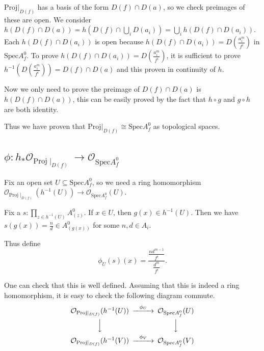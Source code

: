 \documentclass[11pt]{article}
\begin{document}
\(\mathrm{Proj}|_{D(f)}\) has a basis of the form \(D(f)\cap D(a)\), so
we check preimages of these are open. We consider
\(h(D(f)\cap D(a))=h\left(D(f)\cap\bigcup_iD(a_i)\right)=\bigcup_i h(D(f)\cap D(a_i))\).
Each \(h(D(f)\cap D(a_i))\) is open because
\(h(D(f)\cap D(a_i))=D\left(\frac{a_i^m}{f^i}\right)\) in
\(\mathrm{Spec} A^0_f\). To prove
\(h(D(f)\cap D(a_i))=D\left(\frac{a_i^m}{f^i}\right)\), it is sufficient
to prove \(h^{-1}(D\left(\frac{a_i^m}{f^i}\right))=D(f)\cap D(a)\) and
this proven in continuity of \(h\).

Now we only need to prove the preimage of \(D(f)\cap D(a)\) is
\(h(D(f)\cap D(a))\), this can be easily proved by the fact that
\(h\circ g\) and \(g\circ h\) are both identity.

Thus we have proven that
\(\mathrm{Proj}|_{D(f)}\cong \mathrm{Spec} A^0_f\) as topological
spaces.

    \hypertarget{phih_mathcal-o_mathrmprojmid_dfto-mathcal-o_mathrmspeca0_f}{%
\subsection{\texorpdfstring{\(\phi:h_*\mathcal O_{\mathrm{Proj}\mid_{D(f)}}\to \mathcal O_{\mathrm{Spec}A^0_f}\)}{\textbackslash phi:h\_*\textbackslash mathcal O\_\{\textbackslash mathrm\{Proj\}\textbackslash mid\_\{D(f)\}\}\textbackslash to \textbackslash mathcal O\_\{\textbackslash mathrm\{Spec\}A\^{}0\_f\}}}\label{phih_mathcal-o_mathrmprojmid_dfto-mathcal-o_mathrmspeca0_f}}

Fix an open set \(U\subseteq\mathrm{Spec}A^0_f\), so we need a ring
homomorphism
\(\mathcal O_{\mathrm{Proj}\mid_{D(f)}}(h^{-1}(U))\to\mathcal O_{\mathrm{Spec}A^0_f}(U)\).

    Fix a \(s:\prod_{z\in h^{-1}(U)}A^0_{(z)}\). If \(x\in U\), then
\(g(x)\in h^{-1}(U)\). Then we have
\(s(g(x))=\frac n d\in A^0_{(g(x))}\) for some \(n, d \in A_i\).

Thus define \[
\phi_U(s)(x)=\frac{\frac{nd^{m-1}}{f^i}}{\frac{d^m}{f^i}}.
\]

    One can check that this is well defined. Assuming that this is indeed a
ring homomorphism, it is easy to check the following diagram commute.
\[ 
\begin{CD} 
\mathcal O_{\mathrm{Proj}\mid_{D(f)}}(h^{-1}(U)) @>{\phi_U}>> \mathcal O_{\mathrm{Spec}A^0_f}(U) \\
@VVV                                                           @VVV                              \\
\mathcal O_{\mathrm{Proj}\mid_{D(f)}}(h^{-1}(V)) @>{\phi_V}>> \mathcal O_{\mathrm{Spec}A^0_f}(V)
\end{CD}\\ 
\]
\end{document}
